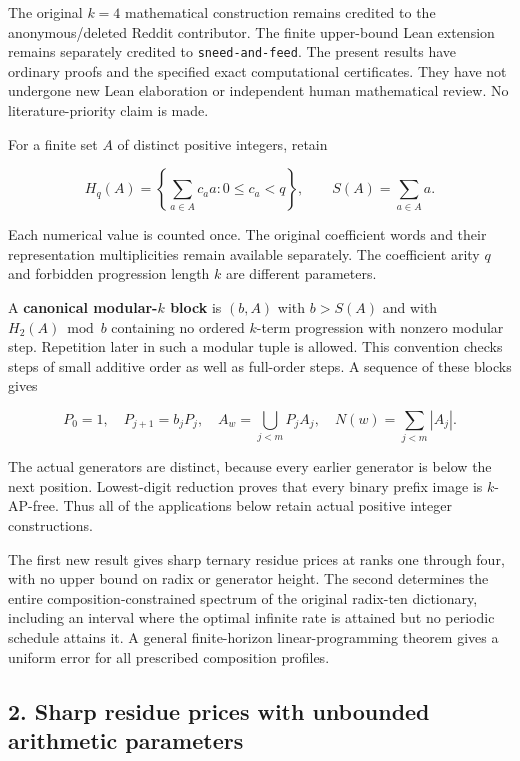 The original \(k=4\) mathematical construction remains credited to the anonymous/deleted Reddit contributor. The finite upper-bound Lean extension remains separately credited to \texttt{sneed-and-feed}. The present results have ordinary proofs and the specified exact computational certificates. They have not undergone new Lean elaboration or independent human mathematical review. No literature-priority claim is made.

For a finite set \(A\) of distinct positive integers, retain

\[
H_q(A)=\left\{\sum_{a\in A}c_a a:0\le c_a<q\right\},
\qquad S(A)=\sum_{a\in A}a.
\]

Each numerical value is counted once. The original coefficient words and their representation multiplicities remain available separately. The coefficient arity \(q\) and forbidden progression length \(k\) are different parameters.

A \textbf{canonical modular-\(k\) block} is \((b,A)\) with \(b>S(A)\) and with \(H_2(A)\bmod b\) containing no ordered \(k\)-term progression with nonzero modular step. Repetition later in such a modular tuple is allowed. This convention checks steps of small additive order as well as full-order steps. A sequence of these blocks gives

\[
P_0=1,\quad P_{j+1}=b_jP_j,\quad
A_w=\bigcup_{j<m}P_jA_j,\quad N(w)=\sum_{j<m}|A_j|.
\]

The actual generators are distinct, because every earlier generator is below the next position. Lowest-digit reduction proves that every binary prefix image is \(k\)-AP-free. Thus all of the applications below retain actual positive integer constructions.

The first new result gives sharp ternary residue prices at ranks one through four, with no upper bound on radix or generator height. The second determines the entire composition-constrained spectrum of the original radix-ten dictionary, including an interval where the optimal infinite rate is attained but no periodic schedule attains it. A general finite-horizon linear-programming theorem gives a uniform error for all prescribed composition profiles.

\subsection{2. Sharp residue prices with unbounded arithmetic parameters}\label{eporig:sharp-residue-prices-with-unbounded-arithmetic-parameters}

